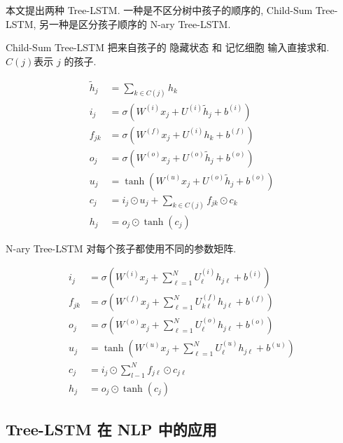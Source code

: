 本文提出两种 Tree-LSTM. 一种是不区分树中孩子的顺序的, Child-Sum Tree-LSTM,
另一种是区分孩子顺序的  N-ary Tree-LSTM.

Child-Sum Tree-LSTM 把来自孩子的
隐藏状态 和 记忆细胞 输入直接求和. $C(j)$表示 $j$ 的孩子.

\begin{equation}
\begin{aligned} \tilde{h}_{j} &=\sum_{k \in C(j)} h_{k} \\
i_{j} &=\sigma\left(W^{(i)} x_{j}+U^{(i)} \tilde{h}_{j}+b^{(i)}\right) \\
f_{j k} &=\sigma\left(W^{(f)} x_{j}+U^{(i)} h_{k}+b^{(f)}\right) \\
o_{j} &=\sigma\left(W^{(o)} x_{j}+U^{(o)} \tilde{h}_{j}+b^{(o)}\right) \\
u_{j} &=\tanh \left(W^{(u)} x_{j}+U^{(o)} \tilde{h}_{j}+b^{(o)}\right) \\
c_{j} &=i_{j} \odot u_{j}+\sum_{k \in C(j)} f_{j k} \odot c_{k} \\
h_{j} &=o_{j} \odot \tanh \left(c_{j}\right)
\end{aligned}
\end{equation}

N-ary Tree-LSTM 对每个孩子都使用不同的参数矩阵.

\begin{equation}
\begin{aligned} i_{j} &=\sigma\left(W^{(i)} x_{j}+\sum_{\ell=1}^{N} U_{\ell}^{(i)} h_{j \ell}+b^{(i)}\right) \\
f_{j k} &=\sigma\left(W^{(f)} x_{j}+\sum_{\ell=1}^{N} U_{k \ell}^{(f)} h_{j \ell}+b^{(f)}\right) \\
o_{j} &=\sigma\left(W^{(o)} x_{j}+\sum_{\ell=1}^{N} U_{\ell}^{(o)} h_{j \ell}+b^{(o)}\right) \\
u_{j} &=\tanh \left(W^{(u)} x_{j}+\sum_{\ell=1}^{N} U_{\ell}^{(u)} h_{j \ell}+b^{(u)}\right) \\
c_{j} &=i_{j} \odot \sum_{l-1}^N f_{j \ell} \odot c_{j \ell} \\
h_{j} &=o_{j} \odot \tanh \left(c_{j}\right)
\end{aligned}
\end{equation}

\subsection{Tree-LSTM 在 NLP 中的应用}







